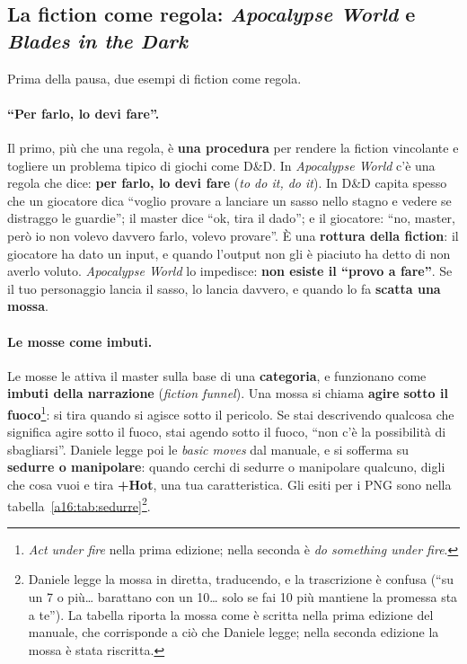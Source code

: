 \subsection{La fiction come regola: \emph{Apocalypse World} e \emph{Blades in the Dark}}
\label{a16:sec:fictionregola}



Prima della pausa, due esempi di fiction come regola.

\paragraph{``Per farlo, lo devi fare''.} Il primo, più che una regola, è \textbf{una procedura}
per rendere la fiction vincolante e togliere un problema tipico di giochi come D\&D. In
\emph{Apocalypse World} c'è una regola che dice: \textbf{per farlo, lo devi fare} (\emph{to do it,
do it}). In D\&D capita spesso che un giocatore dica ``voglio provare a lanciare un sasso nello
stagno e vedere se distraggo le guardie''; il master dice ``ok, tira il dado''; e il giocatore:
``no, master, però io non volevo davvero farlo, volevo provare''. È una \textbf{rottura della
fiction}: il giocatore ha dato un input, e quando l'output non gli è piaciuto ha detto di non averlo
voluto. \emph{Apocalypse World} lo impedisce: \textbf{non esiste il ``provo a fare''}. Se il tuo
personaggio lancia il sasso, lo lancia davvero, e quando lo fa \textbf{scatta una mossa}.

\paragraph{Le mosse come imbuti.} Le mosse le attiva il master sulla base di una
\textbf{categoria}, e funzionano come \textbf{imbuti della narrazione} (\emph{fiction funnel}).
Una mossa si chiama \textbf{agire sotto il fuoco}\footnote{\emph{Act under fire} nella prima
edizione; nella seconda è \emph{do something under fire}.}: si tira quando si agisce sotto il
pericolo. Se stai descrivendo qualcosa che significa agire sotto il fuoco, stai agendo sotto il
fuoco, ``non c'è la possibilità di sbagliarsi''. Daniele legge poi le \emph{basic moves} dal
manuale, e si sofferma su \textbf{sedurre o manipolare}: quando cerchi di sedurre o manipolare
qualcuno, digli che cosa vuoi e tira \textbf{+Hot}, una tua caratteristica. Gli esiti per i PNG
sono nella tabella~\ref{a16:tab:sedurre}\footnote{Daniele legge la mossa in diretta, traducendo,
e la trascrizione è confusa (``su un 7 o più\ldots{} barattano con un 10\ldots{} solo se fai 10
più mantiene la promessa sta a te''). La tabella riporta la mossa come è scritta nella prima
edizione del manuale, che corrisponde a ciò che Daniele legge; nella seconda edizione la mossa è
stata riscritta.}.

